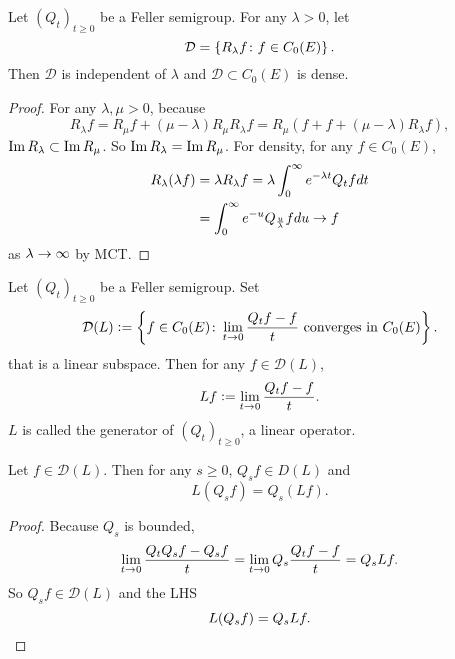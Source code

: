 \begin{prop}
    Let $(Q_t)_{t \geq 0}$ be a Feller semigroup. For any $\lambda > 0$, let 
    \begin{equation*}
        \mathcal{D} = \left\{R_\lambda f \colon f \in C_0(E)\right\}.
    \end{equation*}
    Then $\mathcal{D}$ is independent of $\lambda$ and $\mathcal{D} \subset C_0(E)$ is dense.
\end{prop}
\begin{proof}
    For any $\lambda, \mu > 0$, because
    \begin{equation*}
        R_\lambda f = R_\mu f + (\mu-\lambda)R_\mu R_\lambda f = R_\mu (f + f + (\mu-\lambda)R_\lambda f),
    \end{equation*}
    $\operatorname{Im} R_\lambda \subset \operatorname{Im} R_\mu$. So $\operatorname{Im} R_\lambda = \operatorname{Im} R_\mu$. For density, for any $f \in C_0(E)$, 
    \begin{align*}
        R_\lambda (\lambda f) &= \lambda R_\lambda f = \lambda \int_0^\infty e^{-\lambda t}Q_t f dt \\
        &= \int_0^\infty e^{-u}Q_{\frac{u}{\lambda}}f du \rightarrow f
    \end{align*}
    as $\lambda \rightarrow \infty$ by MCT.
\end{proof}

\begin{defn}[Generator]
    Let $(Q_t)_{t \geq 0}$ be a Feller semigroup. Set 
    \begin{equation*}
        \mathcal{D}(L) \vcentcolon= \left\{f \in C_0(E)\colon \lim_{t \rightarrow 0} \frac{Q_tf - f}{t} \text{ converges in } C_0(E)\right\}.
    \end{equation*}
    that is a linear subspace. Then for any $f \in \mathcal{D}(L)$,
    \begin{equation*}
        Lf \vcentcolon= \lim_{t \rightarrow 0} \frac{Q_tf - f}{t}.
    \end{equation*}
    $L$ is called the generator of $(Q_t)_{t \geq 0}$, a linear operator.
\end{defn}

\begin{prop}
    Let $f \in \mathcal{D}(L)$. Then for any $s \geq 0$, $Q_sf \in D(L)$ and
    \begin{equation*}
        L(Q_s f) = Q_s (L f).
    \end{equation*}
\end{prop}
\begin{proof}
    Because $Q_s$ is bounded,
    \begin{equation*}
        \lim_{t \rightarrow 0} \frac{Q_tQ_sf - Q_sf}{t} = \lim_{t \rightarrow 0} Q_s \frac{Q_t f - f}{t} = Q_s L f.
    \end{equation*}
    So $Q_s f \in \mathcal{D}(L)$ and the LHS
    \begin{equation*}
        L(Q_sf) = Q_s L f. \qedhere
    \end{equation*}
\end{proof}

